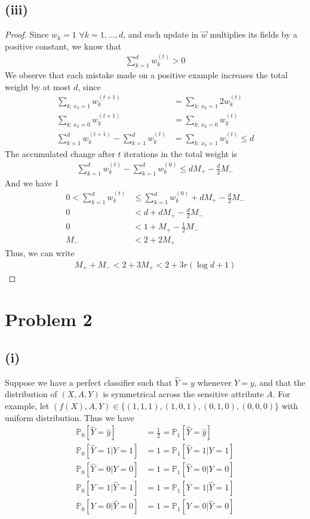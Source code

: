 \documentclass[twoside,11pt]{homework}
\begin{document}
\subsection*{(iii)}
	\begin{proof}
		Since $w_k = 1$ $\forall k = 1,\dots, d$, and each update in $\vec{w}$ multiplies its fields by a positive constant,
		we know that
		\begin{align*}
			\sum_{k=1}^d w_k ^{(t)} > 0
		\end{align*}
		We observe that each mistake made on a positive example increases the total weight by at most $d$, since
		\begin{align*}
			\sum_{k: \,x_k=1} w_k^{(t+1)}  &= \sum_{k: \,x_k=1} 2w_k^{(t)} \\
			\sum_{k: \,x_k=0} w_k^{(t+1)}  &= \sum_{k: \,x_k=0} w_k^{(t)} \\
			\sum_{k=1}^d w_k^{(t+1)}-\sum_{k=1}^d w_k^{(t)} &=   \sum_{k: \,x_k=1} w_k^{(t)} \leq d
		\end{align*}
		The accumulated change after $t$ iterations in the total weight is 
		\begin{align*}
			\sum_{k=1}^d w_k ^{(t)} -\sum_{k=1}^d w_k ^{(0)} \leq d M_+ -\frac{d}{2} M_-
		\end{align*}
		And we have 1
		\begin{align*}
			0<\sum_{k=1}^d w_k ^{(t)} &\leq  \sum_{k=1}^d w_k ^{(0)}  +d M_+ -\frac{d}{2} M_- \\
			0&<d+ d M_+ -\frac{d}{2} M_-\\
			0&<1+  M_+ -\frac{1}{2} M_-\\
			M_- &<2+  2M_+
		\end{align*}
		Thus, we can write
		\begin{align*}
			M_+ + M_-  < 2+ 3M_+< 2+3r(\log{d}+1)
		\end{align*}
	\end{proof}


\section*{Problem 2}
\subsection*{(i)}
	Suppose we have a perfect classifier such that $\hat{Y}=y$ whenever $Y=y$, 
	and that the distribution of $(X,A,Y)$ is symmetrical across the sensitive attribute $A$. 
	For example, let $(f(X),A,Y)\in \{(1,1,1),(1,0,1),(0,1,0),(0,0,0)\}$ with uniform distribution.
	Thus we have
	\begin{align*}
		\mathbb{P}_0[\hat{Y}=\hat{y}] &= \frac{1}{2} = \mathbb{P}_1 [\hat{Y}=\hat{y}] \tag{DP}  \\
		\mathbb{P}_0[\hat{Y}=1|Y=1] &= 1 = \mathbb{P}_1 [\hat{Y}=1|Y=1] \tag{True Positive EO} \\
		\mathbb{P}_0[\hat{Y}=0|Y=0] &= 1 = \mathbb{P}_1 [\hat{Y}=0|Y=0] \tag{True Negative EO} \\
		\mathbb{P}_0[Y=1 | \hat{Y}=1] &=1 = \mathbb{P}_1[Y=1 | \hat{Y}=1] \tag{Positive PP} \\
		\mathbb{P}_0[Y=0 | \hat{Y}=0] &=1 = \mathbb{P}_1[Y=0 | \hat{Y}=0] \tag{Negative PP}
	\end{align*}
\end{document}
